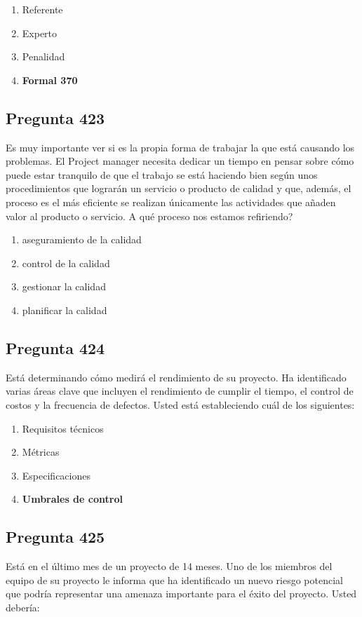 \documentclass[11pt,a4paper]{article}
\begin{document}
\begin{enumerate}[label=\alph*)]
  \item Referente
  \item Experto
  \item Penalidad
  \item \textbf{Formal 370}
\end{enumerate}

\subsection*{Pregunta 423}
Es muy importante ver si es la propia forma de trabajar la que está causando los problemas. El Project manager necesita dedicar un tiempo en pensar sobre cómo puede estar tranquilo de que el trabajo se está haciendo bien según unos procedimientos que lograrán un servicio o producto de calidad y que, además, el proceso es el más eficiente se realizan únicamente las actividades que añaden valor al producto o servicio. A qué proceso nos estamos refiriendo?

\begin{enumerate}[label=\alph*)]
  \item aseguramiento de la calidad
  \item control de la calidad
  \item gestionar la calidad
  \item planificar la calidad
\end{enumerate}

\subsection*{Pregunta 424}
Está determinando cómo medirá el rendimiento de su proyecto. Ha identificado varias áreas clave que incluyen el rendimiento de cumplir el tiempo, el control de costos y la frecuencia de defectos. Usted está estableciendo cuál de los siguientes:

\begin{enumerate}[label=\alph*)]
  \item Requisitos técnicos
  \item Métricas
  \item Especificaciones
  \item \textbf{Umbrales de control}
\end{enumerate}

\subsection*{Pregunta 425}
Está en el último mes de un proyecto de 14 meses. Uno de los miembros del equipo de su proyecto le informa que ha identificado un nuevo riesgo potencial que podría representar una amenaza importante para el éxito del proyecto. Usted debería:
\end{document}
